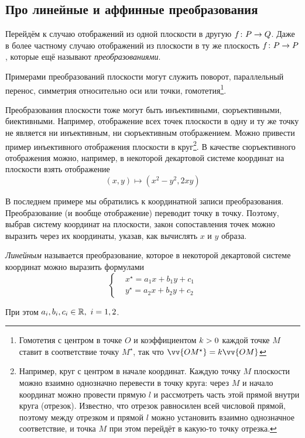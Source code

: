 \documentclass[a4paper,12pt]{article}
\begin{document}
  
  \subsection{Про линейные и аффинные преобразования}
  
  Перейдём к случаю отображений из одной плоскости в другую $f\colon P \hm\to Q$.
  Даже в более частному случаю отображений из плоскости в ту же плоскость $f\colon P \hm\to P$, которые ещё называют \emph{преобразованиями}.
  
  Примерами преобразований плоскости могут служить поворот, параллельный перенос, симметрия относительно оси или точки, гомотетия\footnote{Гомотетия с центром в точке $O$ и коэффициентом $k \hm> 0 $ каждой точке $M$ ставит в соответствие точку $M^\star$, так что $\vv{OM^\star} \hm= k\vv{OM}$}.
  
  Преобразования плоскости тоже могут быть инъективными, сюръективными, биективными.
  Например, отображение всех точек плоскости в одну и ту же точку не является ни инъективным, ни сюръективным отображением.
  Можно привести пример инъективного отображения плоскости в круг\footnote{
    Например, круг с центром в начале координат.
    Каждую точку $M$ плоскости можно взаимно однозначно перевести в точку круга: через $M$ и начало координат можно провести прямую $l$ и рассмотреть часть этой прямой внутри круга (отрезок).
    Известно, что отрезок равносилен всей числовой прямой, поэтому между отрезком и прямой $l$ можно установить взаимно однозначное соответствие, и точка $M$ при этом перейдёт в какую-то точку отрезка.
  }.
  В качестве сюръективного отображения можно, например, в некоторой декартовой системе координат на плоскости взять отображение
  \[
    (x, y) \mapsto \left(x^2 - y^2, 2xy\right)
  \]
  
  В последнем примере мы обратились к координатной записи преобразования.
  Преобразование (и вообще отображение) переводит точку в точку.
  Поэтому, выбрав систему координат на плоскости, закон сопоставления точек можно выразить через их координаты, указав, как вычислять $x$ и $y$ образа.
  
  \begin{definition}
    \emph{Линейным} называется преобразование, которое в некоторой декартовой системе координат можно выразить формулами
    \begin{equation}
      \label{eq:linear}
      \left\{
        \begin{aligned}
          &x^\star = a_1 x + b_1 y + c_1\\
          &y^\star = a_2 x + b_2 y + c_2
        \end{aligned}
      \right.
    \end{equation}
    
    При этом $a_i, b_i, c_i \hm\in \RR,\ i = 1, 2$.
  \end{definition}
  
\end{document}
